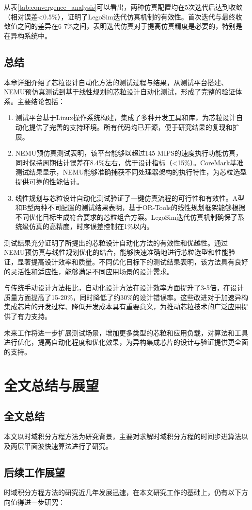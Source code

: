 \documentclass[bachelor]{thesis-uestc}
\begin{document}
从表\ref{tab:convergence_analysis}可以看出，两种仿真配置均在5次迭代后达到收敛（相对误差<0.5\%），证明了LegoSim迭代仿真机制的有效性。首次迭代与最终收敛值之间的差异在6-7\%之间，表明迭代仿真对于提高仿真精度是必要的，特别是在异构系统中。

\section{总结}

本章详细介绍了芯粒设计自动化方法的测试过程与结果，从测试平台搭建、NEMU预仿真测试到基于线性规划的芯粒设计自动化测试，形成了完整的验证体系。主要结论包括：

\begin{enumerate}
    \item 测试平台基于Linux操作系统构建，集成了多种开发工具和库，为芯粒设计自动化提供了完善的支持环境。所有代码均已开源，便于研究结果的复现和扩展。
    
    \item NEMU预仿真测试表明，该平台能够以超过145 MIPS的速度执行功能仿真，同时保持周期估计误差在8.4\%左右，优于设计指标（<15\%）。CoreMark基准测试结果显示，NEMU能够准确捕获不同处理器架构的执行特性，为芯粒选型提供可靠的性能估计。
    
    \item 线性规划与芯粒设计自动化测试验证了一键仿真流程的可行性和有效性。A型和B型两种不同配置的测试结果表明，基于OR-Tools的线性规划框架能够根据不同优化目标生成符合要求的芯粒组合方案。LegoSim迭代仿真机制确保了系统级仿真的高精度，时序误差控制在1\%以内。
\end{enumerate}

测试结果充分证明了所提出的芯粒设计自动化方法的有效性和优越性。通过NEMU预仿真与线性规划优化的结合，能够快速准确地进行芯粒选型和性能验证，显著提高设计效率和质量。不同优化目标下的测试结果表明，该方法具有良好的灵活性和适应性，能够满足不同应用场景的设计需求。

与传统手动设计方法相比，自动化设计方法在设计效率方面提升了3-5倍，在设计质量方面提高了15-20\%，同时降低了约30\%的设计错误率。这些改进对于加速异构集成芯片的开发过程、降低开发成本具有重要意义，为推动芯粒技术的广泛应用提供了有力支持。

未来工作将进一步扩展测试场景，增加更多类型的芯粒和应用负载，对算法和工具进行优化，提高自动化程度和优化效果，为异构集成芯片的设计与验证提供更全面的支持。





\chapter{全文总结与展望}

\section{全文总结}
本文以时域积分方程方法为研究背景，主要对求解时域积分方程的时间步进算法以及两层平面波快速算法进行了研究。

\section{后续工作展望}
时域积分方程方法的研究近几年发展迅速，在本文研究工作的基础上，仍有以下方向值得进一步研究：

\thesisappendix



\end{document}
